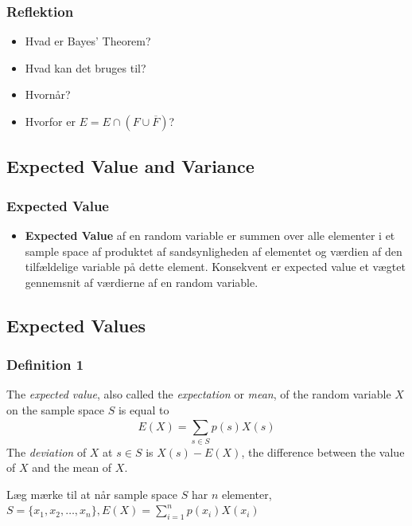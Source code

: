 \documentclass{beamer}
\begin{document}
\begin{frame}
  \frametitle{Reflektion}
  \begin{itemize}
  \item Hvad er Bayes' Theorem?
  \item Hvad kan det bruges til?
  \item Hvornår?
  \item Hvorfor er $E = E \cap (F \cup \overline{F})$?
  \end{itemize}
  
\end{frame}

\subsection{Expected Value and Variance}
\label{subsec:expectedvalue}

\begin{frame}
  \frametitle{Expected Value}
  \begin{itemize}
  \item \textbf{Expected Value} af en random variable er summen over alle elementer i et sample space af produktet af sandsynligheden af elementet og værdien af den tilfældelige variable på dette element. Konsekvent er expected value et vægtet gennemsnit af værdierne af en random variable.
  \end{itemize}
\end{frame}

\subsection{Expected Values}
\label{subsec:expected-values}

\begin{frame}
  \frametitle{Definition 1}
 \begin{definition}
   The \textit{expected value}, also called the \textit{expectation} or \textit{mean}, of the random variable $X$ on the sample space $S$ is equal to
   \[ E(X) = \sum_{s \in S}^{}p(s)X(s) \]
   The \textit{deviation} of $X$ at $s \in S$ is $X(s)-E(X)$, the difference between the value of $X$ and the mean of $X$.
 \end{definition}
 Læg mærke til at når sample space $S$ har $n$ elementer, $S = \{x_{1}, x_{2}, \ldots, x_{n}\}, E(X) = \sum_{i=1}^{n}p(x_{i})X(x_{i})$
\end{frame}
\end{document}
